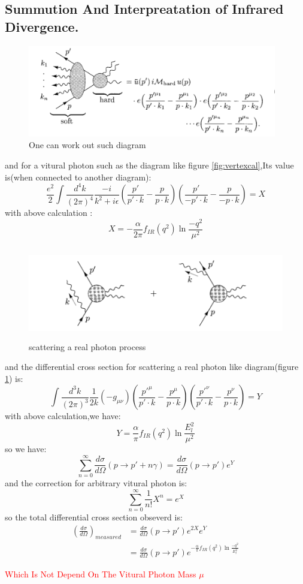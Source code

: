 \subsection{Summution And Interpreatation of Infrared Divergence.}
\begin{figure}
\begin{center}
\includegraphics[height=4cm]{figures/VertexForm}
\caption{One can work out such diagram}
\end{center}
\end{figure}
and for a vitural photon such as the diagram like figure \ref{fig:vertexcal},Its value is(when connected to another diagram):
\[\frac{e^2}{2}\int \frac{d^4 k}{(2\pi)^4}\frac{-i}{k^2+i\epsilon}(\frac{p'}{p'\cdot k}-\frac{p}{p\cdot k})(\frac{p'}{-p'\cdot k}-\frac{p}{-p\cdot k})=X\]
with above calculation :
\[X=-\frac{\alpha}{2\pi}f_{IR}(q^2)\ln\frac{-q^2}{\mu^2}\]
\begin{figure}
\begin{center}
\includegraphics[height=4cm]{figures/realphoton}
\caption{scattering a real photon process}
\label{fig:realphoton}
\end{center}
\end{figure}
and the differential cross section for scattering a real photon like diagram(figure \ref{fig:realphoton}) is:
\[\int \frac{d^3k}{(2\pi)^3} \frac{1}{2k}(-g_{\mu\nu})(\frac{p'^\mu}{p'\cdot k}-\frac{p^\mu}{p\cdot k})(\frac{p'^\nu}{p'\cdot k}-\frac{p^\nu}{p\cdot k})=Y\]
with above calculation,we have:
\[Y=\frac{\alpha}{\pi}f_{IR}(q^2)\ln\frac{E_l^2}{\mu^2}\]
so we have:
\[\sum_{n=0}^\infty\frac{d\sigma}{d\Omega}(p\rightarrow p'+n\gamma)=\frac{d\sigma}{d\Omega}(p\rightarrow p')e^Y\]
and the correction for arbitrary vitural photon is:
\[\sum^{\infty}_{n=0}\frac{1}{n!}X^n=e^{X}\]
so the total differential cross section obseverd is:
\begin{align*}
(\frac{d\sigma}{d\Omega})_{measured}&=\frac{d\sigma}{d\Omega}(p\rightarrow p')e^{2X}e^Y\\
&=\frac{d\sigma}{d\Omega}(p\rightarrow p')e^{-\frac{\alpha}{\pi}f_{IR}(q^2)\ln\frac{-q^2}{E_l^2}}
\end{align*}
\par
\begin{center}
\textcolor{red}{\large{Which Is Not Depend On The  Vitural Photon Mass $\mu$}}
\end{center}

